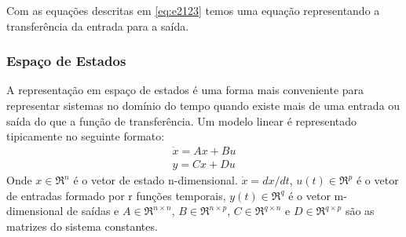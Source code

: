 Com as equações descritas em \eqref{eq:e2123} temos uma equação representando a transferência da entrada para a saída.
\subsubsection{Espaço de Estados}
A representação em espaço de estados é uma forma mais conveniente para representar sistemas no domínio do tempo quando existe mais de uma entrada ou saída do que a função de transferência. Um modelo linear é representado tipicamente no seguinte formato:
\begin{equation}\label{eq:ss}
\begin{array}{c}
\dot{x}=Ax+Bu\\
y=Cx+Du
\end{array}
\end{equation}
Onde $x \in \Re^n$ é o vetor de estado n-dimensional. $\dot{x}=dx/dt$, $u(t) \in \Re^p$ é o vetor de entradas formado por r funções temporais, $y(t) \in \Re^q$ é o vetor m-dimensional de saídas e $A \in \Re^{n\times n}$, $B \in \Re^{n \times p}$, $C \in \Re^{q \times n}$ e $D \in \Re ^{q \times p}$ são as matrizes do sistema constantes.


